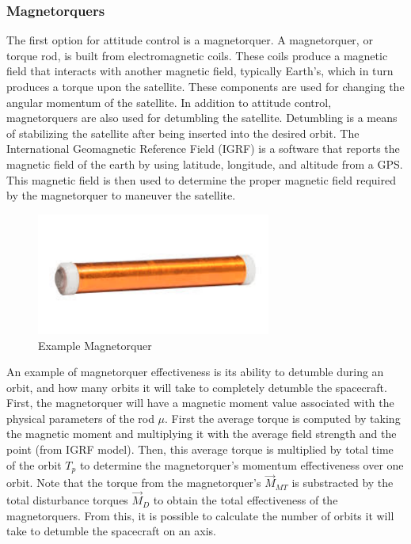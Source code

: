 \subsubsection{Magnetorquers}

The first option for attitude control is a magnetorquer. A
magnetorquer, or torque rod, is built from electromagnetic
coils. These coils produce a magnetic field that interacts with
another magnetic field, typically Earth’s, which in turn produces a
torque upon the satellite\cite{qp14}. These components are used for changing
the angular momentum of the satellite. In addition to attitude
control, magnetorquers are also used for detumbling the
satellite. Detumbling is a means of stabilizing the satellite after
being inserted into the desired orbit\cite{qp15}. The International
Geomagnetic Reference Field (IGRF) is a software that reports the
magnetic field of the earth by using latitude, longitude, and altitude
from a GPS. This magnetic field is then used to determine the proper
magnetic field required by the magnetorquer to maneuver the
satellite.

\begin{figure}[H]
  \begin{center}
  \includegraphics[height=40mm]{Figures/Magnetorquers}
  \end{center}
  \caption{Example Magnetorquer\cite{qp16}}
\end{figure}

An example of magnetorquer effectiveness is its ability to detumble
during an orbit, and how many orbits it will take to completely
detumble the spacecraft. First, the magnetorquer will have a magnetic
moment value associated with the physical parameters of the rod
$\mu$. First the average torque is computed by taking the magnetic
moment and multiplying it with the average field strength and the
point (from IGRF model). Then, this average torque is multiplied by
total time of the orbit $T_p$ to determine 
the magnetorquer’s momentum effectiveness over one orbit. Note that
the torque from the magnetorquer’s $\vec{M}_{MT}$ is substracted by
the total disturbance torques $\vec{M}_D$ to obtain the total
effectiveness of the magnetorquers. From this, it is possible to
calculate the number of orbits it will take to detumble the spacecraft
on an axis.  

